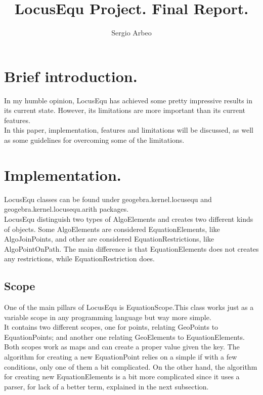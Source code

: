\documentclass[12pt, oneside, a4paper]{article}
\begin{document}
\title{LocusEqu Project. Final Report.}
\author{Sergio Arbeo}\date{}\maketitle

\section{Brief introduction.}

In my humble opinion, LocusEqu has achieved some pretty impressive
results in its current state. However, its limitations are more important than 
its current features.\\

In this paper, implementation, features and limitations will be
discussed, as well as some guidelines for overcoming some of the
limitations.

\section{Implementation.}

LocusEqu classes can be found under geogebra.kernel.locusequ and
geogebra.kernel.locusequ.arith packages.\\

LocusEqu distinguish two types of AlgoElements and creates two
different kinds of objects. Some AlgoElements are considered
EquationElements, like AlgoJoinPoints, and other are considered
EquationRestrictions, like AlgoPointOnPath. The main difference is
that EquationElements does not creates any restrictions, while
EquationRestriction does.

\subsection{Scope}

One of the main pillars of LocusEqu is EquationScope.This class works
just as a variable scope in any programming language but way more
simple.\\

It contains two different scopes, one for points, relating GeoPoints
to EquationPoints; and another one relating GeoElements to
EquationElements. Both scopes work as maps and can create a proper
value given the key. The algorithm for creating a new EquationPoint
relies on a simple if with a few conditions, only one of them a bit
complicated. On the other hand, the algorithm for creating new
EquationElements is a bit more complicated since it uses a parser, for
lack of a better term, explained in the next subsection.
\end{document}
